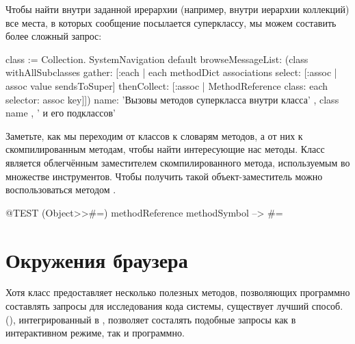 \documentclass[a4paper,10pt,twoside]{book}
\begin{document}
Чтобы найти внутри заданной ирерархии (например, внутри иерархии коллекций) все места, в которых сообщение посылается суперклассу, мы можем составить более сложный запрос:
\begin{code}{}
class := Collection.
SystemNavigation default
  browseMessageList: (class withAllSubclasses gather: [:each |
    each methodDict associations
      select: [:assoc | assoc value sendsToSuper]
      thenCollect: [:assoc | MethodReference class: each selector: assoc key]])
  name: 'Вызовы методов суперкласса внутри класса' , class name , ' и его подклассов'
\end{code}
Заметьте, как мы переходим от классов к словарям методов, а от них к скомпилированным методам, чтобы найти интересующие нас методы.
Класс  является облегчённым заместителем скомпилированного метода, используемым во множестве инструментов.
Чтобы получить такой объект-заместитель можно воспользоваться методом .
\begin{code}{@TEST}
(Object>>#=) methodReference methodSymbol --> #=
\end{code}

\section{Окружения браузера}

Хотя класс  предоставляет несколько полезных методов, позволяющих программно составлять запросы для исследования кода системы, существует лучший способ.  (), интегрированный в \pharo, позволяет состалять подобные запросы как в интерактивном режиме, так и программно.
\end{document}
